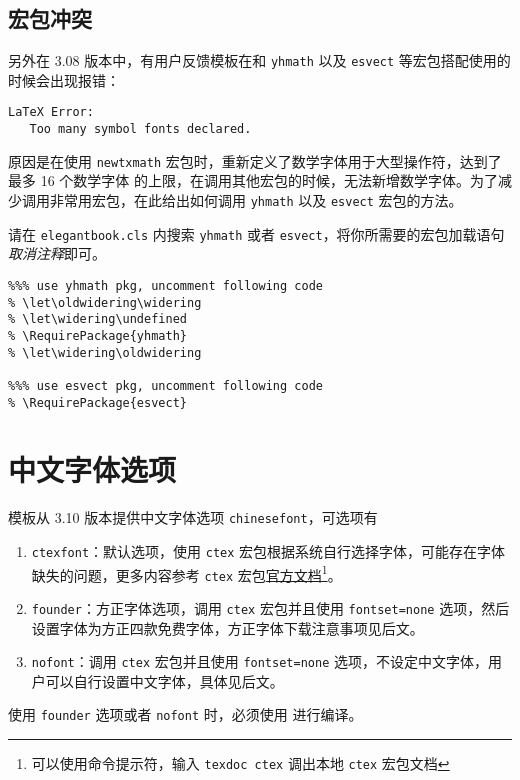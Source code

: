 \documentclass[cn,10pt,math=newtx,citestyle=gb7714-2015,bibstyle=gb7714-2015]{elegantbook}
\begin{document}
\subsection{宏包冲突}

另外在 3.08 版本中，有用户反馈模板在和 \lstinline{yhmath} 以及 \lstinline{esvect} 等宏包搭配使用的时候会出现报错：
\begin{lstlisting}
LaTeX Error:
   Too many symbol fonts declared.
\end{lstlisting}

原因是在使用 \lstinline{newtxmath} 宏包时，重新定义了数学字体用于大型操作符，达到了 {\heiti 最多 16 个数学字体} 的上限，在调用其他宏包的时候，无法新增数学字体。为了减少调用非常用宏包，在此给出如何调用 \lstinline{yhmath} 以及 \lstinline{esvect} 宏包的方法。

请在 \lstinline{elegantbook.cls} 内搜索 \lstinline{yhmath} 或者 \lstinline{esvect}，将你所需要的宏包加载语句\textit{取消注释}即可。
\begin{lstlisting}
%%% use yhmath pkg, uncomment following code
% \let\oldwidering\widering
% \let\widering\undefined
% \RequirePackage{yhmath}
% \let\widering\oldwidering

%%% use esvect pkg, uncomment following code
% \RequirePackage{esvect}
\end{lstlisting}

\section{中文字体选项}
模板从 3.10 版本提供中文字体选项 \lstinline{chinesefont}，可选项有
\begin{enumerate}
\item \lstinline{ctexfont}：默认选项，使用 \lstinline{ctex} 宏包根据系统自行选择字体，可能存在字体缺失的问题，更多内容参考 \lstinline{ctex} 宏包\href{https://ctan.org/pkg/ctex}{官方文档}\footnote{可以使用命令提示符，输入 \lstinline{texdoc ctex} 调出本地 \lstinline{ctex} 宏包文档}。
\item \lstinline{founder}：方正字体选项，调用 \lstinline{ctex} 宏包并且使用 \lstinline{fontset=none} 选项，然后设置字体为方正四款免费字体，方正字体下载注意事项见后文。
\item \lstinline{nofont}：调用 \lstinline{ctex} 宏包并且使用 \lstinline{fontset=none} 选项，不设定中文字体，用户可以自行设置中文字体，具体见后文。
\end{enumerate}

\begin{remark}
  使用 \lstinline{founder} 选项或者 \lstinline{nofont} 时，必须使用  进行编译。
\end{remark}
\end{document}
